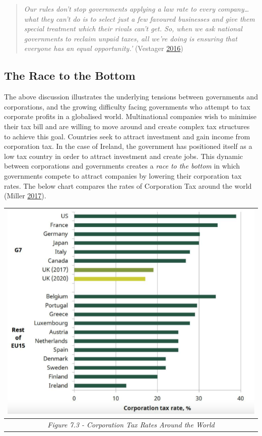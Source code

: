 \documentclass[]{tufte-handout}
\begin{document}
\begin{quote}
\emph{Our rules don't stop governments applying a law rate to every
company\ldots{}what they can't do is to select just a few favoured
businesses and give them special treatment which their rivals can't get.
So, when we ask national governments to reclaim unpaid taxes, all we're
doing is ensuring that everyone has an equal opportunity.'} (Vestager
\protect\hyperlink{ref-Vestager2016}{2016})
\end{quote}

\hypertarget{the-race-to-the-bottom}{%
\subsection{The Race to the Bottom}\label{the-race-to-the-bottom}}

The above discussion illustrates the underlying tensions between
governments and corporations, and the growing difficulty facing
governments who attempt to tax corporate profits in a globalised world.
Multinational companies wish to minimise their tax bill and are willing
to move around and create complex tax structures to achieve this goal.
Countries seek to attract investment and gain income from corporation
tax. In the case of Ireland, the government has positioned itself as a
low tax country in order to attract investment and create jobs. This
dynamic between corporations and governments creates a \emph{race to the
bottom} in which governments compete to attract companies by lowering
their corporation tax rates. The below chart compares the rates of
Corporation Tax around the world (Miller
\protect\hyperlink{ref-Miller2017}{2017}).

\begin{longtable}[]{@{}c@{}}
\toprule
\includegraphics{ChapterPictures/7-3-EUCorpTaxRates.png}\tabularnewline
\midrule
\endhead
\emph{Figure 7.3 - Corporation Tax Rates Around the
World}\tabularnewline
\bottomrule
\end{longtable}
\end{document}
